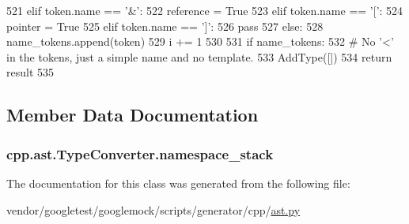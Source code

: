 \begin{DoxyCode}
521             \textcolor{keywordflow}{elif} token.name == \textcolor{stringliteral}{'&'}:
522                 reference = \textcolor{keyword}{True}
523             \textcolor{keywordflow}{elif} token.name == \textcolor{stringliteral}{'['}:
524                pointer = \textcolor{keyword}{True}
525             \textcolor{keywordflow}{elif} token.name == \textcolor{stringliteral}{']'}:
526                 \textcolor{keywordflow}{pass}
527             \textcolor{keywordflow}{else}:
528                 name\_tokens.append(token)
529             i += 1
530 
531         \textcolor{keywordflow}{if} name\_tokens:
532             \textcolor{comment}{# No '<' in the tokens, just a simple name and no template.}
533             AddType([])
534         \textcolor{keywordflow}{return} result
535 
\end{DoxyCode}


\subsection{Member Data Documentation}
\subsubsection[{\texorpdfstring{namespace\+\_\+stack}{namespace_stack}}]{\setlength{\rightskip}{0pt plus 5cm}cpp.\+ast.\+Type\+Converter.\+namespace\+\_\+stack}\hypertarget{classcpp_1_1ast_1_1TypeConverter_abb739f15c6cd0800e07c086c2b30833e}{}\label{classcpp_1_1ast_1_1TypeConverter_abb739f15c6cd0800e07c086c2b30833e}


The documentation for this class was generated from the following file\+:\begin{DoxyCompactItemize}
\item 
vendor/googletest/googlemock/scripts/generator/cpp/\hyperlink{ast_8py}{ast.\+py}\end{DoxyCompactItemize}
